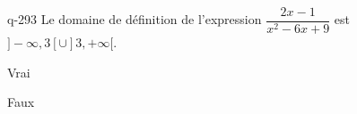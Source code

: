 \begin{truefalse}{q-293}
Le domaine de définition de l'expression $\dfrac{2x-1}{x^2-6x+9}$ est $]-\infty,3[\cup ]3,+\infty[$.
\item* Vrai
\item Faux
\end{truefalse}

